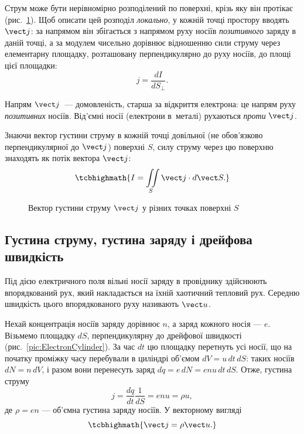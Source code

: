 Струм може бути нерівномірно розподілений по поверхні, крізь яку він протікає (рис.~\ref{pic:IjS}). Щоб описати цей розподіл \emph{локально}, у
кожній точці простору вводять  $\vect j$: за напрямом він збігається з напрямом руху носіїв \emph{позитивного} заряду
в даній точці, а за модулем чисельно дорівнює відношенню сили струму через елементарну площадку, розташовану перпендикулярно до руху носіїв, до
площі цієї площадки:
\begin{equation}\label{eq:CurrentDensityDef}
	j = \frac{dI}{dS_\perp}.
\end{equation}

Напрям $\vect j$~--- домовленість, старша за відкриття електрона: це напрям руху
\emph{позитивних} носіїв. Від'ємні носії (електрони в~металі) рухаються \emph{проти}
$\vect j$.

Знаючи вектор густини струму в кожній точці довільної (не обов'язково перпендикулярної до $\vect j$) поверхні $S$, силу струму через цю поверхню
знаходять як потік вектора $\vect j$:
\begin{equation}\label{eq:CurrentFlux}
	\tcbhighmath{
		I = \iint\limits_S \vect j \cdot d\vect S.
	}
\end{equation}

\begin{figure}\centering
	\caption{Вектор густини струму $\vect j$ у різних точках поверхні $S$\label{pic:IjS}}
\end{figure}

\subsection*{Густина струму, густина заряду і дрейфова швидкість}

Під дією електричного поля вільні носії заряду в провіднику здійснюють впорядкований рух, який накладається на їхній хаотичний тепловий рух. Середню
швидкість цього впорядкованого руху називають  $\vect u$.

Нехай концентрація носіїв заряду дорівнює $n$, а заряд кожного носія --- $e$. Візьмемо площадку $dS$, перпендикулярну до дрейфової швидкості
(рис.~\ref{pic:ElectronCylinder}). За час $dt$ цю площадку перетнуть усі носії, що на початку проміжку часу перебували в циліндрі об'ємом
$dV = u\,dt\, dS$: таких носіїв $dN = n\,dV$, і разом вони перенесуть заряд $dq = e\,dN = enu\,dt\,dS$. Отже, густина струму
\begin{equation*}
	j = \frac{dq}{dt}\frac1{dS} = enu = \rho u,
\end{equation*}
де $\rho = en$ --- об'ємна густина заряду носіїв. У векторному вигляді
\begin{equation}\label{eq:JRhoU}
	\tcbhighmath{
		\vect j = \rho\vect u.
	}
\end{equation}

